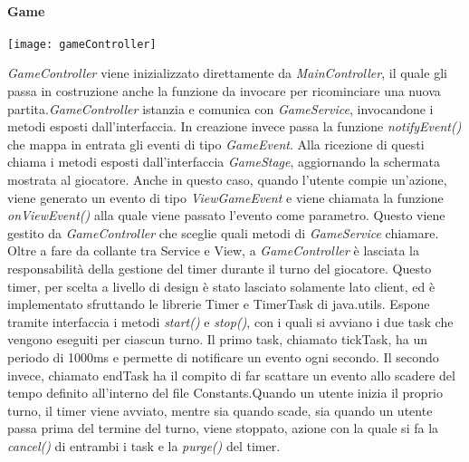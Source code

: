 \paragraph{Game}
\begin{center}
    \texttt{[image: gameController]}
\end{center}
\textit{GameController} viene inizializzato direttamente da \textit{MainController}, il quale gli passa in costruzione anche la funzione da invocare per ricominciare una nuova partita.\newline \textit{GameController} istanzia e comunica con \textit{GameService}, invocandone i metodi esposti dall’interfaccia. In creazione invece passa la funzione \textit{notifyEvent()} che mappa in entrata gli eventi di tipo \textit{GameEvent}.\newline
Alla ricezione di questi chiama i metodi esposti dall’interfaccia \textit{GameStage}, aggiornando la schermata mostrata al giocatore. \newline \newline
Anche in questo caso, quando l’utente compie un'azione, viene generato un evento di tipo \textit{ViewGameEvent} e viene chiamata la funzione \textit{onViewEvent()} alla quale viene passato l’evento come parametro. Questo viene gestito da \textit{GameController} che sceglie quali metodi di \textit{GameService} chiamare.
\newline \newline Oltre a fare da collante tra Service e View, a \textit{GameController} è lasciata la responsabilità della gestione del timer durante il turno del giocatore. \newline Questo timer, per scelta a livello di design è stato lasciato solamente lato client, ed è implementato sfruttando le librerie Timer e TimerTask di java.utils. \newline \newline Espone tramite interfaccia i metodi \textit{start()} e \textit{stop()}, con i quali si avviano i due task che vengono eseguiti per ciascun turno. \newline Il primo task, chiamato tickTask, ha un periodo di 1000ms e permette di notificare un evento ogni secondo. Il secondo invece, chiamato endTask ha il compito di far scattare un evento allo scadere del tempo definito all’interno del file Constants.\newline Quando un utente inizia il proprio turno, il timer viene avviato, mentre sia quando scade, sia quando un utente passa prima del termine del turno, viene stoppato, azione con la quale si fa la \textit{cancel()} di entrambi i task e la \textit{purge()} del timer. \newline \newline
